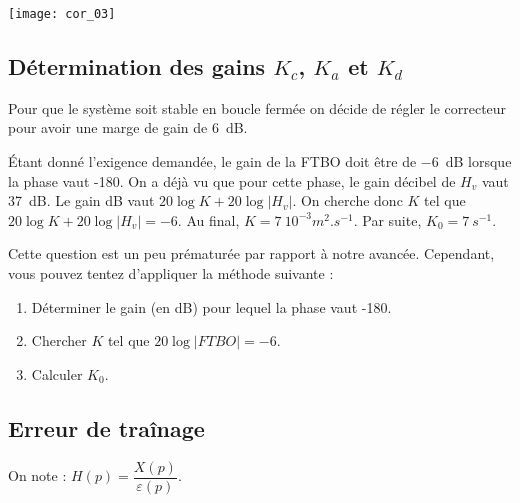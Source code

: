 \begin{multicols}{2}
\begin{corrige}
\end{corrige} 

\begin{center}
\texttt{[image: cor\_03]}
\end{center}

\else \fi




\subsection*{Détermination des gains $K_c$, $K_a$ et $K_d$}
\ifprof
\else
Pour que le système soit stable en boucle fermée on décide de régler le correcteur pour avoir une marge de gain de \SI{6}{dB}.
\fi

\ifprof
\begin{corrige}
Étant donné l'exigence demandée, le gain de la FTBO doit être de \SI{-6}{dB} lorsque la phase vaut -180\degres.
On a déjà vu que pour cette phase, le gain décibel de $H_v$ vaut \SI{37}{dB}. Le gain dB vaut $20\log K + 20 \log |H_v|$. On cherche donc $K$ tel que $20\log K + 20 \log |H_v|=-6$. Au final, $K=\SI{7}{10^{-3}m^2.s^{-1}}$. Par suite, $K_0=\SI{7}{s^{-1}}$.
\end{corrige}
\else
\fi
\ifprof
\else
\begin{methode}
Cette question est un peu prématurée par rapport à notre avancée. Cependant, vous pouvez tentez d'appliquer la méthode suivante : 
\begin{enumerate}
\item Déterminer le gain (en dB) pour lequel la phase vaut -180\degres.
\item Chercher $K$ tel que $20\log|FTBO|=-6$.
\item Calculer $K_0$.
\end{enumerate}
\end{methode}
\fi

\subsection*{Erreur de traînage}
\ifprof
\else
On note :   $H(p)=\dfrac{X(p)}{\varepsilon(p)}$.
\fi



\end{multicols}
